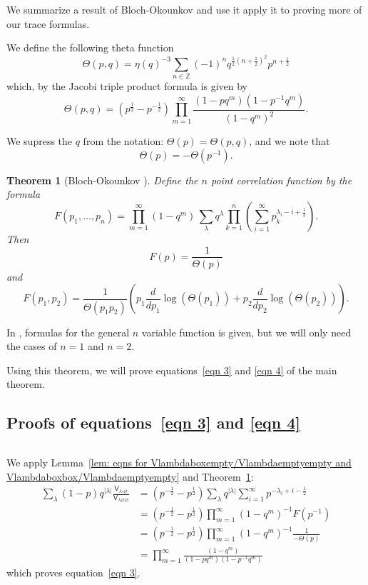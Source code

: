 \documentclass[12pt]{amsart}
\newcommand{\znums} {{\mathbb Z}}		%
\newcommand{\Vsf}{\mathsf{V}}
\newcommand{\bx}{\square}
\renewcommand{\emptyset}{\varnothing}
\newcommand{\half}{\frac{1}{2}}
\newtheorem{theorem}{Theorem}%
\theoremstyle{definition}
\begin{document}
We summarize a result of Bloch-Okounkov \cite{Bloch-Okounkov} and use it apply
it to proving more of our trace formulas. 

We define the following theta function
\[
\Theta (p,q) = \eta (q)^{-3}\sum_{n\in \znums}
(-1)^{n}q^{\half (n+\half )^{2}} p^{n+\half } 
\]
which, by the Jacobi triple product formula is given by
\[
\Theta (p,q) = (p^{\half} -p^{-\half})\prod_{m=1}^{\infty}
\frac{(1-pq^{m})(1-p^{-1}q^{m})}{(1-q^{m})^{2}}. 
\]

We supress the $q$ from the notation: $\Theta (p) = \Theta (p,q)$, and
we note that
\[
\Theta (p) = -\Theta (p^{-1}).
\]

\begin{theorem}[Bloch-Okounkov \cite{Bloch-Okounkov}]\label{thm: Bloch-Okounkov thm}
Define the $n$ point correlation function by the formula
\[
F(p_{1},\dots ,p_{n}) = \prod_{m=1}^{\infty}(1-q^{m})\, \sum_{\lambda}
q^{\lambda} \prod_{k=1}^{n} \left(\sum_{i=1}^{\infty} p_{k}^{\lambda_{i}-i+\half } \right).
\]
Then
\[
F(p) = \frac{1}{\Theta (p)}
\]
and
\[
F(p_{1},p_{2}) = \frac{1}{\Theta
(p_{1}p_{2})}\left(p_{1}\frac{d}{dp_{1}}\log(\Theta (p_{1}))+ p_{2}\frac{d}{dp_{2}}\log(\Theta (p_{2})) \right).
\]
\end{theorem}

In \cite{Bloch-Okounkov}, formulas for the general $n$ variable
function is given, but we will only need the cases of $n=1$ and
$n=2$.

Using this theorem, we will prove equations~\eqref{eqn 3} and
\eqref{eqn 4} of the main theorem.

\subsection{Proofs of equations~\eqref{eqn 3} and \eqref{eqn
4}}\label{subsec: pfs of eqn 3 and 4} $\, $
    


We apply Lemma~\ref{lem: eqns for Vlambdaboxempty/Vlambdaemptyempty
and Vlambdaboxbox/Vlambdaemptyempty} and Theorem~\ref{thm: Bloch-Okounkov thm}:
\begin{align*}
\sum_{\lambda}(1-p) q^{|\lambda |} \frac{\Vsf_{\lambda \bx
\emptyset}}{\Vsf_{\lambda \emptyset \emptyset}} &=
(p^{-\half}-p^{\half}) \sum_{\lambda} q^{|\lambda |}\sum_{i=1}^{\infty}p^{-\lambda_{i}+i-\half}\\
&=(p^{-\half}-p^{\half}) \prod_{m=1}^{\infty}(1-q^{m})^{-1} F(p^{-1})\\
&=(p^{-\half}-p^{\half}) \prod_{m=1}^{\infty}(1-q^{m})^{-1} \frac{1}{-\Theta (p)}\\
&=\prod_{m=1}^{\infty} \frac{(1-q^{m})}{(1-pq^{m})(1-p^{-1}q^{m})}
\end{align*}
which proves equation~\eqref{eqn 3}.
\end{document}

